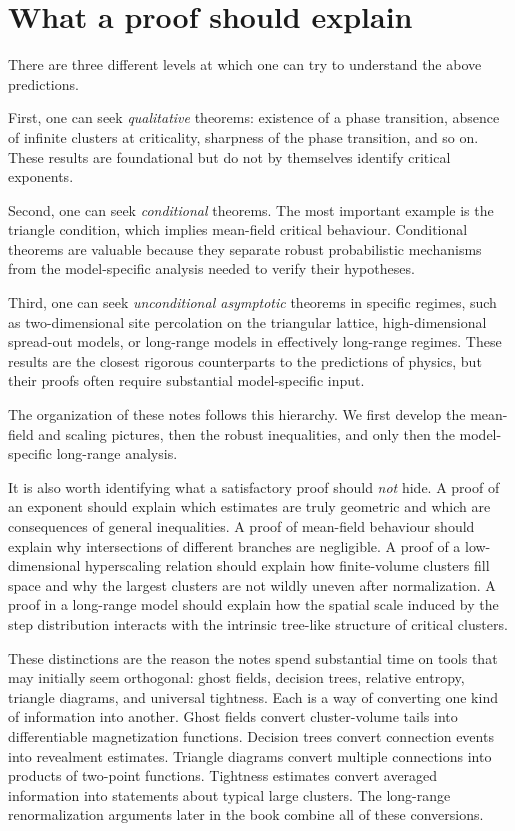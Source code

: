 \documentclass[11pt,reqno]{book}
\numberwithin{equation}{chapter}
\theoremstyle{plain}
\theoremstyle{definition}
\theoremstyle{remark}
\newcommand{\1}{\mathbf 1}
\begin{document}
\section{What a proof should explain}

There are three different levels at which one can try to understand the above predictions.

First, one can seek \emph{qualitative} theorems: existence of a phase transition, absence of infinite clusters at criticality, sharpness of the phase transition, and so on. These results are foundational but do not by themselves identify critical exponents.

Second, one can seek \emph{conditional} theorems. The most important example is the triangle condition, which implies mean-field critical behaviour. Conditional theorems are valuable because they separate robust probabilistic mechanisms from the model-specific analysis needed to verify their hypotheses.

Third, one can seek \emph{unconditional asymptotic} theorems in specific regimes, such as two-dimensional site percolation on the triangular lattice, high-dimensional spread-out models, or long-range models in effectively long-range regimes. These results are the closest rigorous counterparts to the predictions of physics, but their proofs often require substantial model-specific input.

The organization of these notes follows this hierarchy. We first develop the mean-field and scaling pictures, then the robust inequalities, and only then the model-specific long-range analysis.

It is also worth identifying what a satisfactory proof should \emph{not} hide. A proof of an exponent should explain which estimates are truly geometric and which are consequences of general inequalities. A proof of mean-field behaviour should explain why intersections of different branches are negligible. A proof of a low-dimensional hyperscaling relation should explain how finite-volume clusters fill space and why the largest clusters are not wildly uneven after normalization. A proof in a long-range model should explain how the spatial scale induced by the step distribution interacts with the intrinsic tree-like structure of critical clusters.

These distinctions are the reason the notes spend substantial time on tools that may initially seem orthogonal: ghost fields, decision trees, relative entropy, triangle diagrams, and universal tightness. Each is a way of converting one kind of information into another. Ghost fields convert cluster-volume tails into differentiable magnetization functions. Decision trees convert connection events into revealment estimates. Triangle diagrams convert multiple connections into products of two-point functions. Tightness estimates convert averaged information into statements about typical large clusters. The long-range renormalization arguments later in the book combine all of these conversions.
\end{document}

